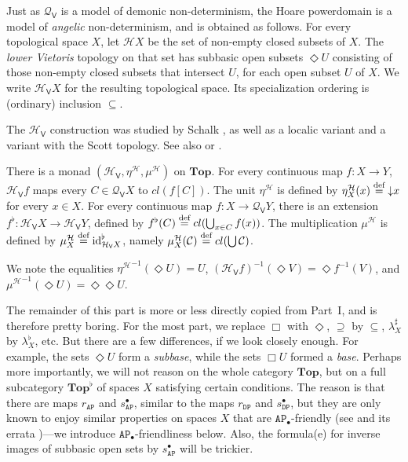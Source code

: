 \documentclass[preprint,12pt]{elsarticle}
\newcommand\eqdef{\mathrel{\buildrel \text{def}\over=}}
\DeclareMathOperator{\dc}{\downarrow\!}
\newcommand\identity[1]{\mathrm{id}_{#1}}
\newcommand\Angel{{\mathtt{A}}}
\newcommand\Demon{{\mathtt{D}}}
\newcommand\Nature{{\mathtt{P}}}
\newcommand\AN{{\Angel\Nature}}
\newcommand\DN{{\Demon\Nature}}
\newcommand\Smyth{{\mathcal Q}}
\newcommand\Hoare{{\mathcal H}}
\newcommand\Vt{\mathsf{V}}
\newcommand\HV{\Hoare_\Vt}
\newcommand\SV{\Smyth_{\Vt}}
\newcommand\Topcat{\mathbf{Top}}
\begin{document}
Just as $\SV$ is a model of demonic non-determinism, the Hoare
powerdomain is a model of \emph{angelic} non-determinism, and is
obtained as follows.  For every topological space $X$, let $\Hoare X$
be the set of non-empty closed subsets of $X$.  The \emph{lower
  Vietoris} topology on that set has subbasic open subsets $\Diamond
U$ consisting of those non-empty closed subsets that intersect $U$,
for each open subset $U$ of $X$.  We write $\HV X$ for the resulting
topological space.  Its specialization ordering is (ordinary)
inclusion $\subseteq$.

The $\HV$ construction was studied by Schalk
\cite[Section~6]{schalk:diss}, as well as a localic variant and a
variant with the Scott topology.  See also \cite[Sections~6.2.2,
6.2.3]{AJ:domains} or \cite[Section~IV-8]{GHKLMS:contlatt}.

There is a monad $(\HV, \eta^\Hoare, \mu^\Hoare)$ on $\Topcat$.  For
every continuous map $f \colon X \to Y$, $\HV f$ maps every
$C \in \SV X$ to $cl (f [C])$.  The unit $\eta^\Hoare$ is defined by
$\eta^\Hoare_X (x) \eqdef \dc x$ for every $x \in X$.  For every
continuous map $f \colon X \to \SV Y$, there is an extension
$f^\flat \colon \HV X \to \HV Y$, defined by
$f^\flat (C) \eqdef cl (\bigcup_{x \in C} f (x))$.  The multiplication
$\mu^\Hoare$ is defined by
$\mu^\Hoare_X \eqdef \identity {\HV X}^\flat$, namely
$\mu^\Hoare_X (\mathcal C) \eqdef cl (\bigcup \mathcal C)$.

We note the equalities ${\eta^\Hoare}^{-1} (\Diamond U) = U$,
${(\HV f)}^{-1} (\Diamond V) = \Diamond {f^{-1} (V)}$, and
${\mu^\Hoare}^{-1} (\Diamond U) = \Diamond {\Diamond U}$.

The remainder of this part is more or less directly copied from
Part~I, and is therefore pretty boring.  For the most part, we replace
$\Box$ with $\Diamond$, $\supseteq$ by $\subseteq$, $\lambda^\sharp_X$
by $\lambda^\flat_X$, etc.  But there are a few differences, if we
look closely enough.  For example, the sets $\Diamond U$ form a
\emph{subbase}, while the sets $\Box U$ formed a \emph{base}.  Perhaps
more importantly, we will not reason on the whole category $\Topcat$,
but on a full subcategory $\Topcat^\flat$ of spaces $X$ satisfying
certain conditions.  The reason is that there are maps $r_\AN$ and
$s_\AN^\bullet$, similar to the maps $r_\DN$ and $s_\DN^\bullet$, but
they are only known to enjoy similar properties on spaces $X$ that are
$\AN_\bullet$-friendly (see \cite{JGL-mscs16} and its errata
\cite{JGL:mscs16:errata})---we introduce $\AN_\bullet$-friendliness
below.  Also, the formula(e) for inverse images of subbasic open sets
by $s_\AN^\bullet$ will be trickier.
\end{document}
